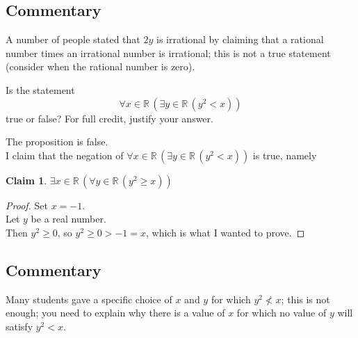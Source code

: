 \documentclass[12pt]{midterm}
\newtheorem*{claim}{Claim}
\begin{document}
\begin{exam}
\begin{solution}
\begin{solutiontext}
\color{magenta!50!black}
\vfill
\setlength{\leftskip}{0in}
\subsection*{Commentary}

A number of people stated that $2y$ is irrational by claiming that a
rational number times an irrational number is irrational; this is not
a true statement (consider when the rational number is zero).

\end{solutiontext}\end{solution}


\begin{problem}[360]
  Is the statement
  $$
  \forall x \in \mathbb{R} \, \left( \exists y \in \mathbb{R}\, \left( y^2 < x \right) \right)
  $$
  true or false?  For full credit, justify your answer.
\end{problem}

\begin{solution}\begin{solutiontext}
    The proposition is false. \\
    I claim that the negation of $\forall x \in \mathbb{R} \, \left( \exists y \in
      \mathbb{R}\, \left( y^2 < x \right) \right)$ is true, namely
    \begin{claim}
      $\exists x \in \mathbb{R} \, \left( \forall y \in
      \mathbb{R}\, \left( y^2 \geq x \right) \right)$
    \end{claim}
    \begin{proof}
      Set $x = -1$. \\
      Let $y$ be a real number. \\
      Then $y^2 \geq 0$, so $y^2 \geq 0 > -1 = x$, which is what I wanted to prove.
    \end{proof}

\color{magenta!50!black}
\vfill
\setlength{\leftskip}{0in}
\subsection*{Commentary}

Many students gave a specific choice of $x$ and $y$ for which $y^2
\not< x$; this is not enough; you need to explain why there is a
value of $x$ for which no value of $y$ will satisfy $y^2 < x$.

\end{solutiontext}\end{solution}


\end{exam}

\pagebreak

\vfill
\null
\end{document}

